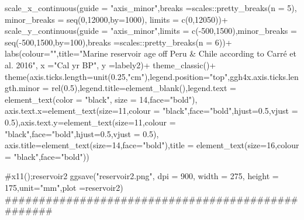 \documentclass[
]{article}
\newenvironment{Shaded}{\begin{snugshade}}{\end{snugshade}}
\newcommand{\NormalTok}[1]{#1}
\begin{document}
\begin{Shaded}
\begin{Highlighting}[]
\NormalTok{  scale\_x\_continuous(guide = "axis\_minor",breaks =scales::pretty\_breaks(n = 5),}
\NormalTok{                     minor\_breaks = seq(0,12000,by=1000),}
\NormalTok{                     limits = c(0,12050))+}
\NormalTok{  scale\_y\_continuous(guide = "axis\_minor",limits = c({-}500,1500),minor\_breaks = seq({-}500,1500,by=100),breaks =scales::pretty\_breaks(n = 6))+}
\NormalTok{  labs(colour="",title="Marine reservoir age off Peru \& Chile according to Carré et al. 2016",}
\NormalTok{       x ="Cal yr BP", }
\NormalTok{       y =labely2)+}
\NormalTok{  theme\_classic()+}
\NormalTok{  theme(axis.ticks.length=unit(0.25,"cm"),legend.position="top",ggh4x.axis.ticks.length.minor = rel(0.5),legend.title=element\_blank(),legend.text = element\_text(color = "black", size = 14,face="bold"),}
\NormalTok{        axis.text.x=element\_text(size=11,colour = "black",face="bold",hjust=0.5,vjust = 0.5),axis.text.y=element\_text(size=11,colour = "black",face="bold",hjust=0.5,vjust = 0.5),}
\NormalTok{        axis.title=element\_text(size=14,face="bold"),title = element\_text(size=16,colour = "black",face="bold"))}

\NormalTok{\#x11();reservoir2}
\NormalTok{ggsave("reservoir2.png", dpi = 900,   width = 275,}
\NormalTok{       height = 175,unit="mm",plot =reservoir2)}
\NormalTok{\#\#\#\#\#\#\#\#\#\#\#\#\#\#\#\#\#\#\#\#\#\#\#\#\#\#\#\#\#\#\#\#\#\#\#\#\#\#\#\#\#\#\#\#\#\#\#\#\#\#  }
  

\end{Highlighting}
\end{Shaded}
\end{document}

